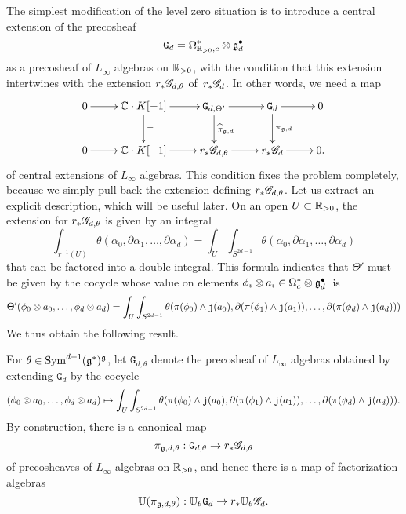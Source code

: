 The simplest modification of the level zero situation is to introduce a central extension of the precosheaf
\[
\mathtt{G}_d = \Omega^*_{\mathbb R_{>0},c} \otimes \mathfrak g^\bullet_d
\] 
as a precosheaf of $L_\infty$ algebras on $\mathbb R_{>0}$,
with the condition that this extension intertwines with the extension $r_*\mathscr G_{d,\theta}$ of~$r_* \mathscr G_{d}$.
In other words, we need a map 
\[
\xymatrix{
0 \ar[r] & \CC \cdot K [-1]  \ar[d]^{=} \ar[r] & \mathtt{G}_{d,\Theta'} \ar[d]^{{\Hat{\pi}}_{\fg,d}} \ar[r] & \mathtt{G}_d \ar[d]^{\pi_{\fg, d}} \ar[r] & 0 \\
0 \ar[r] & \CC \cdot K [-1] \ar[r] & r_*\sG_{d,\theta} \ar[r] & r_* \sG_{d} \ar[r] & 0 .
}
\]
of central extensions of $L_\infty$ algebras.
This condition fixes the problem completely, 
because we simply pull back the extension defining $r_*\mathscr G_{d,\theta}$.
Let us extract an explicit description,
which will be useful later.
On an open $U \subset \mathbb R_{>0}$, the extension for $r_*\mathscr G_{d,\theta}$ is given by an integral
\[
\int_{r^{-1}(U)} \theta(\alpha_0,\partial \alpha_1,\ldots,\partial \alpha_d) = \int_U \int_{S^{2d-1}} \theta(\alpha_0,\partial \alpha_1,\ldots,\partial \alpha_d)
\]
that can be factored into a double integral. 
This formula indicates that $\Theta'$ must be given by the cocycle whose value on elements $\phi_i \otimes a_i \in \Omega^*_c \otimes \mathfrak g^\bullet_d$~is
\begin{align*}
\Theta'(\phi_0 \otimes a_0, \ldots, \phi_d \otimes a_d)
&= \int_U \int_{S^{2d-1}} \theta(\pi(\phi_0) \wedge {\mathtt{j}}(a_0),\partial (\pi(\phi_1) \wedge {\mathtt{j}}(a_1)),\ldots,\partial(\pi(\phi_d) \wedge {\mathtt{j}}(a_d))) \\
\end{align*}
We thus obtain the following result.

\begin{lem} 
For $\theta \in {\rm Sym}^{d+1}(\mathfrak g^*)^\mathfrak g$,
let $\mathtt{G}_{d,\theta}$ denote the precosheaf of $L_\infty$ algebras obtained by extending $\mathtt{G}_d$ by the cocycle
\[
(\phi_0 \otimes a_0, \ldots, \phi_d \otimes a_d) \mapsto \int_U \int_{S^{2d-1}} \theta(\pi(\phi_0) \wedge {\mathtt{j}}(a_0),\partial (\pi(\phi_1) \wedge {\mathtt{j}}(a_1)),\ldots,\partial(\pi(\phi_d) \wedge {\mathtt{j}}(a_d))).
\]
By construction, there is a canonical map 
\[
\pi_{\mathfrak g,d,\theta}: \mathtt{G}_{d,\theta} \to r_* \mathscr G_{d,\theta}
\]
of precosheaves of $L_\infty$ algebras on $\mathbb R_{>0}$, 
and hence there is a map of factorization algebras
\[
\mathbb U(\pi_{\mathfrak g,d,\theta}): \mathbb U_{\theta} \mathtt{G}_d \to r_* \mathbb U_\theta \mathscr G_d.
\]
\end{lem}

